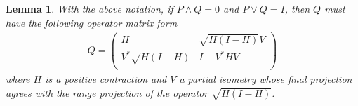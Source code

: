 \documentclass{jaums}
\theoremstyle{thmit} %
\newtheorem{lemma}[theorem]{Lemma}
\theoremstyle{thmrm} %
\begin{document}
\begin{lemma} With the above notation, if $P\wedge Q=0$ and $P\vee Q=I$, then
$Q$ must have the following operator matrix form
\begin{align}
Q=\left(
                                                           \begin{array}{cc}
                                                             H & \sqrt{H(I-H)}V
\\
                                                             V^*\sqrt{H(I-H)} &
I-V^*HV \\
                                                           \end{array}
                                                         \right)
\end{align}
where $H$ is a positive contraction and $V$ a partial isometry whose final
projection agrees with the range projection of the operator $\sqrt{H(I-H)}$.
\end{lemma}
\end{document}
